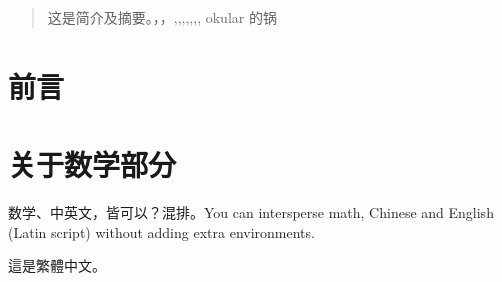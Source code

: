 \documentclass{ctexart}
\begin{document}
\tableofcontents

\begin{abstract}
这是简介及摘要。，，,,,,,,, okular 的锅
\end{abstract}

\section{前言}

\section{关于数学部分}
数学、中英文，皆可以？混排。You can intersperse math, Chinese and English (Latin script) without adding extra environments.

這是繁體中文。
\end{document}
